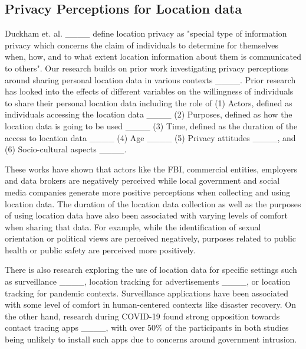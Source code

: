 \subsection{Privacy Perceptions for Location data}
Duckham et. al. ____ define location privacy as "special type of information
 privacy which concerns the claim of individuals to determine for themselves when,
 how, and to what extent location information about them is communicated to others".
 Our research builds on prior work investigating privacy perceptions around sharing personal location data in various contexts ____. Prior research has looked into the effects of different variables on the willingness of individuals to share their personal location data including the role of (1) Actors, defined as individuals accessing the location data ____ (2) Purposes, defined as how the location data is going to be used ____ (3) Time, defined as the duration of the access to location data ____ (4) Age  ____ (5) Privacy attitudes ____, and  (6) Socio-cultural aspects ____.

These works have shown that actors like the FBI, commercial entities, employers and data brokers are negatively perceived while local government and social media companies generate more positive perceptions when collecting and using location data. The duration of the location data collection as well as the purposes of using location data have also been associated with varying levels of comfort when sharing that data. For example, while the identification of sexual orientation or political views are perceived negatively, purposes related to public health or public safety are perceived more positively.




There is also research exploring the use of location data for specific settings such as surveillance  ____, location tracking for advertisements ____, 
or location tracking for pandemic contexts. 
Surveillance applications have been associated with some level of comfort in human-centered contexts like disaster recovery.
On the other hand, research during COVID-19 found strong opposition towards contact tracing apps ____, with over 50\% of the participants in both studies being unlikely to install such apps due to concerns around government intrusion. 

